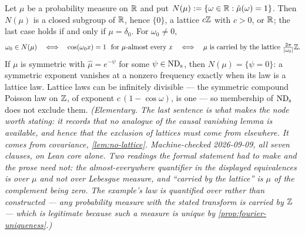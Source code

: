 \begin{lemma}\label{lem:lattice-zero}
\leanok
{}
Let $\mu$ be a probability measure on $\mathbb{R}$ and put
$N(\mu) := \{\omega \in \mathbb{R} : \hat\mu(\omega) = 1\}$. Then $N(\mu)$ is a closed subgroup of
$\mathbb{R}$, hence $\{0\}$, a lattice $c\mathbb{Z}$ with $c > 0$, or $\mathbb{R}$; the last case holds if and only
if $\mu = \delta_0$. For $\omega_0 \ne 0$,
\[
  \omega_0 \in N(\mu)
  \quad\Longleftrightarrow\quad
  \cos(\omega_0 x) = 1 \ \text{ for } \mu\text{-almost every } x
  \quad\Longleftrightarrow\quad
  \mu \text{ is carried by the lattice } \tfrac{2\pi}{|\omega_0|}\mathbb{Z} .
\]
If $\mu$ is symmetric with $\hat\mu = e^{-\psi}$ for some $\psi \in \mathrm{ND}_{\mathrm{s}}$, then
$N(\mu) = \{\psi = 0\}$: a symmetric exponent vanishes at a nonzero frequency exactly when its
law is a lattice law. Lattice laws can be infinitely divisible --- the symmetric compound
Poisson law on $\mathbb{Z}$, of exponent $c\,(1 - \cos\omega)$, is one --- so membership of $\mathrm{ND}_{\mathrm{s}}$
does not exclude them.
\statusT\quad\emph{(Elementary. The last sentence is what makes the node worth stating: it
records that no analogue of the causal vanishing lemma is available, and hence that the
exclusion of lattices must come from elsewhere. It comes from covariance,
\ref{lem:no-lattice}. Machine-checked 2026-09-09, all seven clauses, on Lean core alone. Two
readings the formal statement had to make and the prose need not: the almost-everywhere
quantifier in the displayed equivalences is over $\mu$ and not over Lebesgue measure, and
``carried by the lattice'' is $\mu$ of the complement being zero. The example's law is
\emph{quantified over} rather than constructed --- any probability measure with the stated
transform is carried by $\mathbb{Z}$ --- which is legitimate because such a measure is unique by
\ref{prop:fourier-uniqueness}.)}
\end{lemma}

